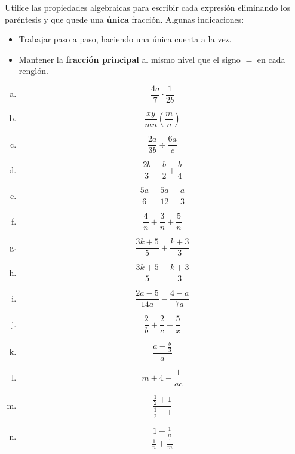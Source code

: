 \documentclass[11pt]{article}
\begin{document}
\begin{exercise}
    Utilice las propiedades algebraicas para escribir cada expresión eliminando los paréntesis y que quede una \textbf{única} fracción. Algunas indicaciones:
    \begin{itemize}
        \item Trabajar paso a paso, haciendo una única cuenta a la vez.
        \item Mantener la \textbf{fracción principal} al mismo nivel que el signo $=$ en cada renglón.
    \end{itemize}

\begin{multicols}{3}
\begin{enumerate}[a)]
    \item \[ \frac{4a}{7} \cdot \frac{1}{2b} \]
    \item \[ \frac{xy}{mn} \left(\frac{m}{n}\right) \]
    \item \[ \frac{2a}{3b} \div \frac{6a}{c} \]
    \item \[ \frac{2b}{3} - \frac{b}{2} + \frac{b}{4} \]
    \item \[ \frac{5a}{6} - \frac{5a}{12} - \frac{a}{3} \]
    \item \[ \frac{4}{n} + \frac{3}{n} + \frac{5}{n} \]
    \item \[ \frac{3k + 5}{5} + \frac{k+3}{3} \]
    \item \[ \frac{3k+5}{5} - \frac{k+3}{3} \]
    \item \[ \frac{2a-5}{14 a} - \frac{4-a}{7a} \]
    \item \[\frac{2}{b} + \frac{2}{c} + \frac{5}{x} \]
    \item \[ \frac{a - \frac{b}{3}}{a} \]
    \item \[ m + 4 - \frac{1}{ac} \]
    \item \[ \frac{\frac{1}{2} +1}{\frac{1}{2} - 1} \]
    \item \[ \frac{1+\frac{1}{n}}{\frac{1}{n} + \frac{1}{m}} \]
\end{enumerate}
\end{multicols}
\end{exercise}
\end{document}
